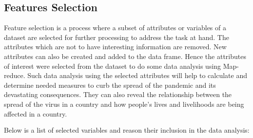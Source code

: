 \documentclass[11pt]{article}
\begin{document}
\subsection{Features Selection}
Feature selection is a process where a subset of attributes or variables of a dataset are selected for further processing to address the task at hand. The attributes which are  not to have interesting information are removed. New  attributes can also be created and added to the data frame. Hence the  attributes  of interest were selected from the dataset  to do some data analysis using Map-reduce.  Such data analysis using the selected attributes will help to calculate and determine needed measures to curb the spread of the pandemic and its devastating consequences. They can also reveal the relationship between the spread of the virus in a country and how people's lives and livelihoods are being affected in a country.

Below is a list of selected variables and reason their inclusion in the data analysis:
\end{document}
